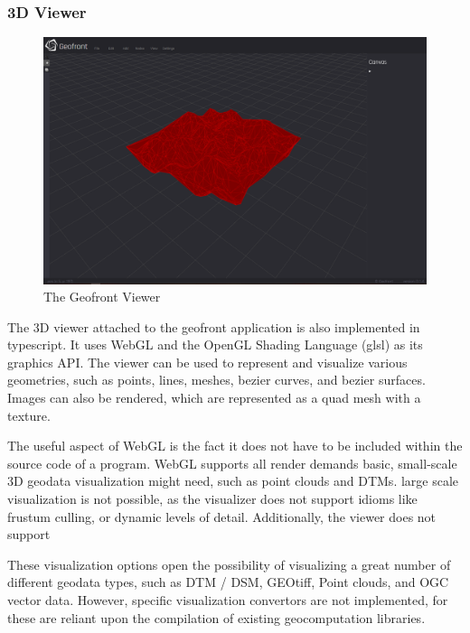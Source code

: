 \subsubsection*{3D Viewer}

\begin{figure}
  \centering
  \graphicspath{ {../../assets/images/implementation/} }
  \includegraphics[width=\linewidth]{viewer.png}
  \caption[Geofront viewer]{The Geofront Viewer}
  \label{fig:geofront-viewer}
\end{figure}

The 3D viewer attached to the geofront application is also implemented in typescript. 
It uses WebGL and the OpenGL Shading Language (glsl) as its graphics API. 
The viewer can be used to represent and visualize various geometries, such as points, lines, meshes, bezier curves, and bezier surfaces.
Images can also be rendered, which are represented as a quad mesh with a texture. 

The useful aspect of WebGL is the fact it does not have to be included within the source code of a program. 
WebGL supports all render demands basic, small-scale 3D geodata visualization might need, such as point clouds and DTMs.
large scale visualization is not possible, as the visualizer does not support idioms like frustum culling, or dynamic levels of detail. 
Additionally, the viewer does not support

These visualization options open the possibility of visualizing a great number of different geodata types, such as DTM / DSM, GEOtiff, Point clouds, and OGC vector data. 
However, specific visualization convertors are not implemented, for these are reliant upon the compilation of existing geocomputation libraries. 

